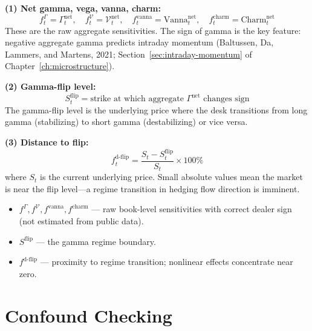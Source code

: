 \begin{definition}
\textbf{(1) Net gamma, vega, vanna, charm:}
\begin{equation}
\label{eq:net-greeks}
f^{\Gamma}_t = \Gamma^{\text{net}}_t, \quad
f^{\mathcal{V}}_t = \mathcal{V}^{\text{net}}_t, \quad
f^{\text{vanna}}_t = \text{Vanna}^{\text{net}}_t, \quad
f^{\text{charm}}_t = \text{Charm}^{\text{net}}_t
\end{equation}
These are the raw aggregate sensitivities.  The sign of gamma is the
key feature: negative aggregate gamma predicts intraday momentum
(Baltussen, Da, Lammers, and Martens, 2021;
Section~\ref{sec:intraday-momentum} of Chapter~\ref{ch:microstructure}).

\textbf{(2) Gamma-flip level:}
\begin{equation}
\label{eq:gamma-flip}
S^{\text{flip}}_t = \text{strike at which aggregate } \Gamma^{\text{net}}
  \text{ changes sign}
\end{equation}
The gamma-flip level is the underlying price where the desk transitions
from long gamma (stabilizing) to short gamma (destabilizing) or vice
versa.

\textbf{(3) Distance to flip:}
\begin{equation}
\label{eq:dist-flip}
f^{\text{d-flip}}_t = \frac{S_t - S^{\text{flip}}_t}{S_t} \times 100\%
\end{equation}
where $S_t$ is the current underlying price.  Small absolute values
mean the market is near the flip level---a regime transition in hedging
flow direction is imminent.

\begin{itemize}[nosep]
  \item $f^{\Gamma}, f^{\mathcal{V}}, f^{\text{vanna}},
        f^{\text{charm}}$ --- raw book-level sensitivities with
        correct dealer sign (not estimated from public data).
  \item $S^{\text{flip}}$ --- the gamma regime boundary.
  \item $f^{\text{d-flip}}$ --- proximity to regime transition;
        nonlinear effects concentrate near zero.
\end{itemize}
\end{definition}


\section{Confound Checking}
\label{sec:confounds}

